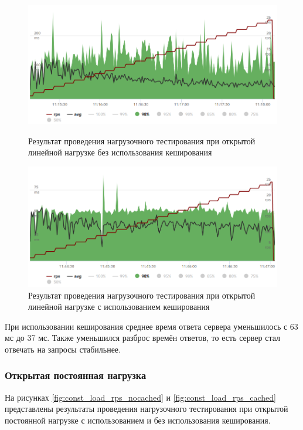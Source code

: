\begin{figure}[h]
	\centering
	\includegraphics[width=\textwidth ]{img/Load_testing/line_load_rps_nocached.png}
	\caption{Результат проведения нагрузочного тестирования при открытой линейной нагрузке без использования кеширования}
	\label{fig:line_load_rps_nocached}
	
	\centering
	\includegraphics[width=\textwidth ]{img/Load_testing/line_load_rps_cached.png}
	\caption{Результат проведения нагрузочного тестирования при открытой линейной нагрузке с использованием кеширования}
	\label{fig:line_load_rps_cached}
\end{figure} 

\clearpage

При использовании кеширования среднее время ответа сервера уменьшилось с 63 мс до 37 мс. Также уменьшился разброс времён ответов, то есть сервер стал отвечать на запросы стабильнее. %

\subsubsection{Открытая постоянная нагрузка}

На рисунках \ref{fig:const_load_rps_nocached} и \ref{fig:const_load_rps_cached} представлены результаты проведения нагрузочного тестирования при открытой постоянной нагрузке с использованием и без использования кеширования.

